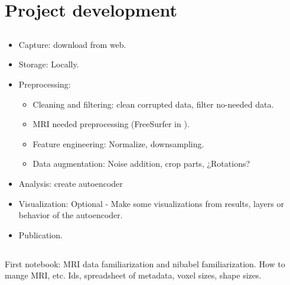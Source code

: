 \chapter{Project development}
\label{chapter:development}


\section{}

\section{}
\label{section:datalifecycle}

\begin{itemize}
    \item Capture: download from web.
    \item Storage: Locally.
    \item Preprocessing:
    \begin{itemize}
        \item Cleaning and filtering: clean corrupted data, filter no-needed data.
        \item MRI needed preprocessing (FreeSurfer in \cite{pinaya2019}).
        \item Feature engineering: Normalize, downsampling.
        \item Data augmentation: Noise addition, crop parts, ¿Rotations?
    \end{itemize}
    \item Analysis: create autoencoder
    \item Visualization: Optional - Make some visualizations from results, layers or behavior of the autoencoder.
    \item Publication.
\end{itemize}

\section{}

First notebook: MRI data familiarization and nibabel familiarization. How to mange MRI, etc. Ids, spreadsheet of metadata, voxel sizes, shape sizes.

